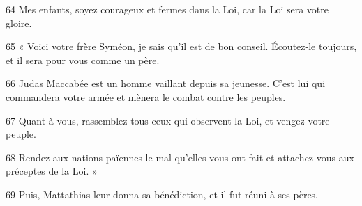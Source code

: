 
64 Mes enfants, soyez courageux et fermes dans la Loi, car la Loi sera votre gloire.

65 « Voici votre frère Syméon, je sais qu’il est de bon conseil. Écoutez-le toujours, et il sera pour vous comme un père.

66 Judas Maccabée est un homme vaillant depuis sa jeunesse. C’est lui qui commandera votre armée et mènera le combat contre les peuples.

67 Quant à vous, rassemblez tous ceux qui observent la Loi, et vengez votre peuple.

68 Rendez aux nations païennes le mal qu’elles vous ont fait et attachez-vous aux préceptes de la Loi. »

69 Puis, Mattathias leur donna sa bénédiction, et il fut réuni à ses pères.
